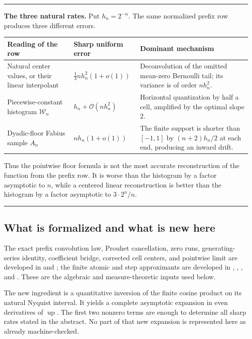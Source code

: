 \documentclass[11pt,oneside]{article}
\theoremstyle{definition}
\theoremstyle{remark}
\newcommand{\Up}{\operatorname{up}}
\newcommand{\bigO}{\mathcal O}
\newenvironment{boxedremark}{%
  \par\smallskip\noindent\begin{center}\begin{minipage}{0.94\textwidth}%
  \color{black}\hrule\vspace{0.6em}\small
}{%
  \vspace{0.6em}\hrule\end{minipage}\end{center}\smallskip
}
\begin{document}
\begin{boxedremark}
\textbf{The three natural rates.}
Put $h_n=2^{-n}$.  The same normalized prefix row produces three different errors.
\begin{center}
\begin{tabularx}{0.95\textwidth}{@{}>{\raggedright\arraybackslash}p{}
>{\raggedright\arraybackslash}p{}X@{}}
\toprule
Reading of the row & Sharp uniform error & Dominant mechanism\\
\midrule
Natural center values, or their linear interpolant
& $\displaystyle \frac13 n h_n^2(1+o(1))$
& Deconvolution of the omitted mean-zero Bernoulli tail; its variance is of order $nh_n^2$.\\[0.35em]
Piecewise-constant histogram $\mathcal W_n$
& $\displaystyle h_n+\bigO(nh_n^2)$
& Horizontal quantization by half a cell, amplified by the optimal slope $2$.\\[0.35em]
Dyadic-floor Fabius sample $A_n$
& $\displaystyle n h_n(1+o(1))$
& The finite support is shorter than $[-1,1]$ by $(n+2)h_n/2$ at each end, producing an inward drift.\\
\bottomrule
\end{tabularx}
\end{center}
Thus the pointwise floor formula is not the most accurate reconstruction of the function from
the prefix row.  It is worse than the histogram by a factor asymptotic to $n$, while a
centered linear reconstruction is better than the histogram by a factor asymptotic to
$3\cdot2^n/n$.
\end{boxedremark}

\subsection{What is formalized and what is new here}

The exact prefix convolution law, Prouhet cancellation, zero runs, generating-series identity,
coefficient bridge, corrected cell centers, and pointwise limit are developed in
 and ; the finite atomic and step
approximants are developed in ,
, , and
 \cite{proveit}.  These are the algebraic and
measure-theoretic inputs used below.

The new ingredient is a quantitative inversion of the finite cosine product on its natural
Nyquist interval.  It yields a complete asymptotic expansion in even derivatives of $\Up$.
The first two nonzero terms are enough to determine all sharp rates stated in the abstract.
No part of that new expansion is represented here as already machine-checked.
\end{document}
